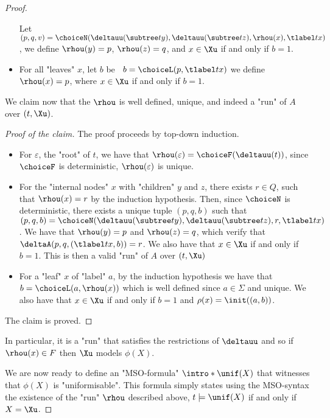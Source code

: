 \documentclass[a4paper,UKenglish,cleveref, autoref, thm-restate]{lipics-v2021}
\begin{document}
\begin{proof}
\begin{itemize}
		      Let $(p,q,v) = \choiceN(\deltauu(\subtree t y), \deltauu(\subtree t z), \rhou(x), \tlabel t x)$, we define $\rhou(y)=p$, $\rhou(z)=q$, and $x \in \Xu$ if and only if $b = 1$.
		\item For all "leaves" $x$, let $b$ be ~$b = \choiceL(p, \tlabel t x)$ we define $\rhou (x) = p$, where $x \in \Xu$ if and only if $b = 1$.
	\end{itemize}

	\begin{claim}
		We claim now that the $\rhou$ is well defined, unique, and indeed a "run" of $A$ over $(t,\Xu)$.
	\end{claim}

	\begin{proof}[Proof of the claim]
		The proof proceeds by top-down induction.
		\begin{itemize}
			\item For $\varepsilon$, the "root" of $t$, we have that $\rhou(\varepsilon) = \choiceF(\deltauu(t))$, since $\choiceF$ is deterministic, $\rhou(\varepsilon)$ is unique.
			\item For the "internal nodes" $x$ with "children" $y$ and $z$, there exists $r \in Q$, such that $\rhou (x) = r$ by the induction hypothesis. Then,
			      since $\choiceN$ is deterministic, there exists a unique tuple $(p,q,b)$ such that $(p,q,b) = \choiceN(\deltauu(\subtree t y), \deltauu(\subtree t z), r, \tlabel t x)$.
			      We have that $\rhou(y) = p$ and $\rhou(z) = q$, which verify that $\deltaA(p,q,(\tlabel t x,b)) = r$. We also have that $x \in \Xu$ if and only if $b = 1$.
			      This is then a valid "run" of $A$ over $(t,\Xu)$
			\item For a "leaf" $x$ of "label" $a$, by the induction hypothesis we have that $b = \choiceL(a, \rhou(x))$ which is well defined since $a \in \Sigma$ and unique.
			      We also have that $x \in \Xu$ if and only if $b = 1$ and $\rho(x) = \init((a,b))$.
		\end{itemize}
		The claim is proved.
	\end{proof}

	In particular, it is a "run" that satisfies the restrictions of $\deltauu$ and so if $\rhou(x) \in F$ then $\Xu$ models $\phi(X)$.

	\AP We are now ready to define an "MSO-formula" $\intro*\unif (X)$ that witnesses that $\phi(X)$ is "uniformisable".
	This formula simply states using the MSO-syntax the existence of the "run" $\rhou$ described above, \ie
	$t \models \unif(X)$ if and only if $X=\Xu$.


\end{proof}
\end{document}
